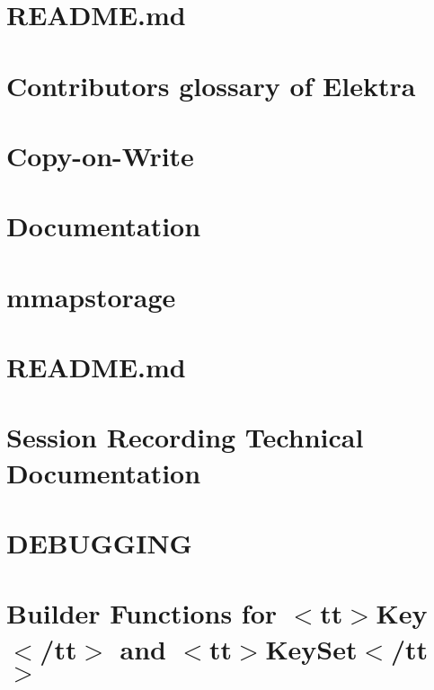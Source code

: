 \let\mypdfximage\pdfximage\def\pdfximage{\immediate\mypdfximage}\documentclass[twoside]{book}
\newcommand{\+}{\discretionary{\mbox{\scriptsize$\hookleftarrow$}}{}{}}
\begin{document}
\chapter{README.\+md}
\label{doc_contrib_api_usecases_README_md}

\chapter{Contributor\textquotesingle{}s glossary of Elektra}
\label{doc_contrib_contrib-glossary_md}

\chapter{Copy-\/on-\/\+Write}
\label{doc_contrib_copy_on_write_md}

\chapter{Documentation}
\label{doc_contrib_documentation_md}

\chapter{mmapstorage}
\label{doc_contrib_mmapstorage_md}

\chapter{README.\+md}
\label{doc_contrib_README_md}

\chapter{Session Recording Technical Documentation}
\label{doc_contrib_recording_md}

\chapter{DEBUGGING}
\label{doc_DEBUGGING_md}

\chapter{Builder Functions for $<$tt$>$Key$<$/tt$>$ and $<$tt$>$Key\+Set$<$/tt$>$}
\label{doc_decisions_0_drafts_builder_functions_md}

\end{document}
